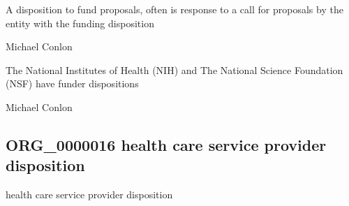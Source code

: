 \documentclass[letterpaper,10pt,english]{sphinxmanual}
\begin{document}
\begin{sphinxShadowBox}

\sphinxAtStartPar
A disposition to fund proposals, often is response to a call for proposals by the entity with the funding disposition
\end{sphinxShadowBox}

\begin{sphinxShadowBox}

\sphinxAtStartPar
Michael Conlon 
\end{sphinxShadowBox}

\begin{sphinxShadowBox}

\sphinxAtStartPar
The National Institutes of Health (NIH) and The National Science Foundation (NSF) have funder dispositions
\end{sphinxShadowBox}

\begin{sphinxShadowBox}

\sphinxAtStartPar
{}
\end{sphinxShadowBox}

\begin{sphinxShadowBox}

\sphinxAtStartPar
Michael Conlon 
\end{sphinxShadowBox}
\begin{quote}

\ignorespaces \end{quote}


\subsection{ORG\_0000016 \sphinxhyphen{} health care service provider disposition}
\label{\detokenize{doc-ORG_0000016:org-0000016-health-care-service-provider-disposition}}\label{\detokenize{doc-ORG_0000016:index-0}}\label{\detokenize{doc-ORG_0000016::doc}}
\begin{sphinxShadowBox}

\sphinxAtStartPar
health care service provider disposition
\end{sphinxShadowBox}
\end{document}
